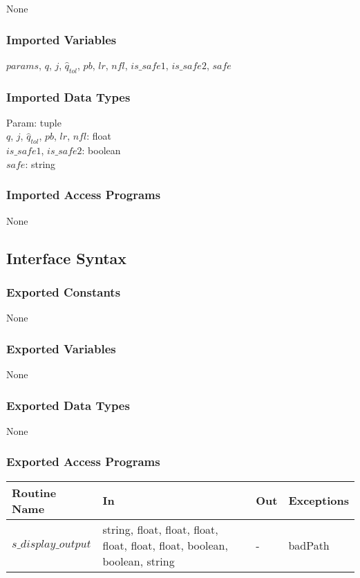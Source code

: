 \documentclass[12pt]{article}
\begin{document}
None

\subsubsection{Imported Variables}

$params$, $q$, $j$, $\hat{q}_{tol}$, $pb$, $lr$, $nfl$, $is\_safe1$, $is\_safe2$, $safe$ 

\subsubsection{Imported Data Types}

Param: tuple \\
$q$, $j$, $\hat{q}_{tol}$, $pb$, $lr$, $nfl$: float \\
$is\_safe1$, $is\_safe2$: boolean \\
$safe$: string

\subsubsection{Imported Access Programs}

None

\subsection{Interface Syntax}

\subsubsection{Exported Constants}

None

\subsubsection{Exported Variables}

None

\subsubsection{Exported Data Types}

None

\subsubsection{Exported Access Programs}
\begin{center}
\begin{tabular}{l p{5cm} l l} \hline 
\textbf{Routine Name} & \textbf{In} &\textbf{Out} & \textbf{Exceptions} \\ \hline 
$s\_display\_output$ &string, float, float, float, \newline float, float, float, boolean, \newline boolean, string& - & badPath \\ \hline
\end{tabular}
\end{center}
\end{document}
